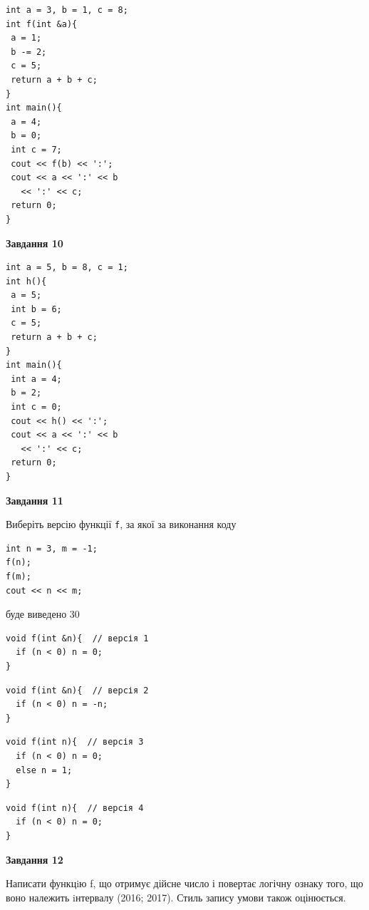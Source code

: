 \documentclass[12pt, ukrainian]{article}
\def\code#1{\Verb!#1!}
\begin{document}
{\begin {large}
\begin{minipage}[t]{7.0cm}
\begin{verbatim}
int a = 3, b = 1, c = 8;
int f(int &a){
 a = 1;
 b -= 2;
 c = 5;
 return a + b + c;
}
int main(){
 a = 4;
 b = 0;
 int c = 7;
 cout << f(b) << ':';
 cout << a << ':' << b 
   << ':' << c;
 return 0;
}
\end{verbatim}



\begin{center}
\textbf{Завдання 10}
\end{center}
\vspace{-8mm}

\begin{verbatim}
int a = 5, b = 8, c = 1;
int h(){
 a = 5;
 int b = 6;
 c = 5;
 return a + b + c;
}
int main(){
 int a = 4;
 b = 2;
 int c = 0;
 cout << h() << ':';
 cout << a << ':' << b 
   << ':' << c;
 return 0;
}
\end{verbatim}

\end{minipage}
\vline \hspace{1mm}
\begin{minipage}[t]{11.0cm}

\begin{center}
\textbf{Завдання 11}
\end{center}
Виберіть версію функції \code{f}, за якої за виконання коду
\begin{verbatim}
int n = 3, m = -1;
f(n);
f(m);
cout << n << m;
\end{verbatim}

буде виведено 30

\begin{verbatim}
void f(int &n){  // версія 1
  if (n < 0) n = 0;
}
\end{verbatim}

\vspace{-8mm}\begin{verbatim}
void f(int &n){  // версія 2
  if (n < 0) n = -n;
}
\end{verbatim}

\vspace{-8mm}\begin{verbatim}
void f(int n){  // версія 3
  if (n < 0) n = 0;
  else n = 1;
}
\end{verbatim}

\vspace{-8mm}\begin{verbatim}
void f(int n){  // версія 4
  if (n < 0) n = 0;
}
\end{verbatim}



\begin{center}
\textbf{Завдання 12}
\end{center}

Написати функцiю f, що отримує дійсне число і повертає логічну ознаку того, що воно належить iнтервалу (2016; 2017). Стиль запису умови також оцінюється.\par

\end{minipage}

\end {large}}
\newpage
\end{document}
